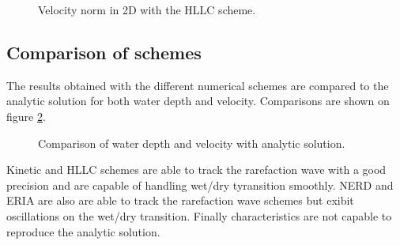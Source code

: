 \begin{figure}[H]
 \centering
  \caption{Velocity norm in 2D with the HLLC scheme.}
  \label{fig:ritter:Ufirstobs1d}
\end{figure}

\subsection{Comparison of schemes}

The results obtained with the different numerical schemes are compared to the analytic solution for both
water depth and velocity. Comparisons are shown on figure \ref{fig:ritter:comparison}.

\begin{figure}[H]
\begin{minipage}[t]{0.5\textwidth}
 \centering
\end{minipage}%
\begin{minipage}[t]{0.5\textwidth}
 \centering
\end{minipage}
\begin{minipage}[t]{0.5\textwidth}
 \centering
\end{minipage}%
\begin{minipage}[t]{0.5\textwidth}
 \centering
\end{minipage}
\begin{minipage}[t]{0.5\textwidth}
 \centering
\end{minipage}%
\begin{minipage}[t]{0.5\textwidth}
 \centering
\end{minipage}
  \caption{Comparison of water depth and velocity with analytic solution.}
  \label{fig:ritter:comparison}
\end{figure}

Kinetic and HLLC schemes are able to track the rarefaction wave with a good precision and are capable of
handling wet/dry tyransition smoothly.
NERD and ERIA are also are able to track the rarefaction wave schemes 
but exibit oscillations on the wet/dry transition. 
Finally characteristics are not capable to reproduce the analytic solution.

